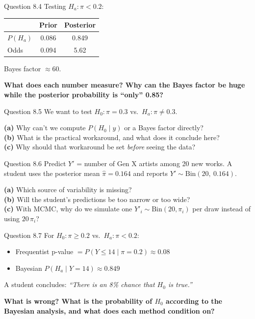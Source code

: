 \documentclass[aspectratio=43,11pt]{beamer}
\begin{document}
\begin{frame}{Question 8.4}
  Testing $H_a: \pi < 0.2$:
  \vspace{0.3em}
  \begin{center}
  \begin{tabular}{@{}lcc@{}}
    \toprule
    & Prior & Posterior \\
    \midrule
    $P(H_a)$ & 0.086 & 0.849 \\
    Odds & 0.094 & 5.62 \\
    \bottomrule
  \end{tabular}
  \end{center}
  Bayes factor $\approx 60$.
  \vspace{0.6em}

  \textbf{What does each number measure? Why can the Bayes factor be huge
  while the posterior probability is ``only'' 0.85?}
\end{frame}

\begin{frame}{Question 8.5}
  We want to test $H_0: \pi = 0.3$ vs.\ $H_a: \pi \neq 0.3$.
  \vspace{0.6em}

  \textbf{(a)} Why can't we compute $P(H_0 \mid y)$ or a Bayes factor
  directly? \\[0.3em]
  \textbf{(b)} What is the practical workaround, and what does it conclude
  here? \\[0.3em]
  \textbf{(c)} Why should that workaround be set \emph{before} seeing the
  data?
\end{frame}

\begin{frame}{Question 8.6}
  Predict $Y'$ = number of Gen X artists among 20 new works.
  A student uses the posterior mean $\hat\pi = 0.164$ and reports
  $Y' \sim \text{Bin}(20,\ 0.164)$.
  \vspace{0.6em}

  \textbf{(a)} Which source of variability is missing? \\[0.3em]
  \textbf{(b)} Will the student's predictions be too narrow or too wide? \\[0.3em]
  \textbf{(c)} With MCMC, why do we simulate one $Y'_i \sim
  \text{Bin}(20, \pi_i)$ per draw instead of using $20\,\pi_i$?
\end{frame}

\begin{frame}{Question 8.7}
  For $H_0: \pi \geq 0.2$ vs.\ $H_a: \pi < 0.2$:
  \begin{itemize}
    \item Frequentist p-value $= P(Y \le 14 \mid \pi = 0.2) \approx 0.08$
    \item Bayesian $P(H_a \mid Y = 14) \approx 0.849$
  \end{itemize}
  \vspace{0.4em}
  A student concludes: \emph{``There is an 8\% chance that $H_0$ is true.''}
  \vspace{0.6em}

  \textbf{What is wrong? What is the probability of $H_0$ according to the
  Bayesian analysis, and what does each method condition on?}
\end{frame}
\end{document}
